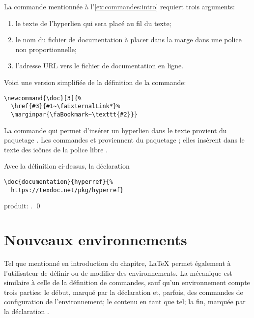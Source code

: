 \begin{exemple}
  \label{ex:commandes:doc}
  La commande \cmdprint{\doc} mentionnée à
  l'\autoref{ex:commandes:intro} requiert trois arguments:
  \begin{enumerate}
  \item le texte de l'hyperlien qui sera placé au fil du texte;
  \item le nom du fichier de documentation à placer dans la marge dans
    une police non proportionnelle;
  \item l'adresse URL vers le fichier de documentation en ligne.
  \end{enumerate}
  Voici une version simplifiée de la définition de la commande:
\begin{lstlisting}
\newcommand{\doc}[3]{%
  \href{#3}{#1~\faExternalLink*}%
  \marginpar{\faBookmark~\texttt{#2}}}
\end{lstlisting}
  La commande \cmd{\href} qui permet d'insérer un hyperlien dans le
  texte provient du paquetage  \citep{hyperref}. Les
  commandes  et \cmdprint{\faBookmark}
  proviennent du paquetage  \citep{fontawesome5};
  elles insèrent dans le texte des icônes de la police libre %
  . %

  Avec la définition ci-dessus, la déclaration
\begin{lstlisting}
\doc{documentation}{hyperref}{%
  https://texdoc.net/pkg/hyperref}
\end{lstlisting}
  produit: . %
  \qed
\end{exemple}


\section{Nouveaux environnements}
\label{sec:commandes:environnements}

Tel que mentionné en introduction du chapitre, {\LaTeX} permet
également à l'utilisateur de définir ou de modifier des
environnements. La mécanique est similaire à celle de la définition de
commandes, sauf qu'un environnement compte trois parties: le début,
marqué par la déclaration  et, parfois, des
  commandes de configuration de l'environnement; le contenu en tant
  que tel; la fin, marquée par la déclaration
  .

